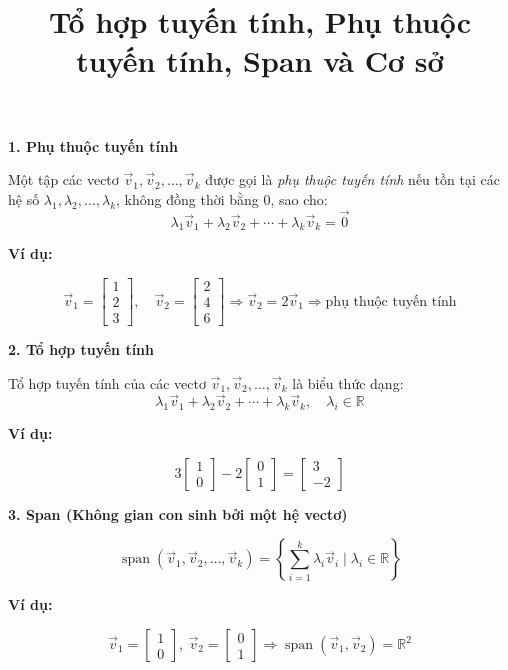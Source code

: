 \documentclass[12pt]{article}
\title{Tổ hợp tuyến tính, Phụ thuộc tuyến tính, Span và Cơ sở}
\date{}
\begin{document}
\maketitle

\textbf{1. Phụ thuộc tuyến tính}

Một tập các vectơ \( \vec{v}_1, \vec{v}_2, \ldots, \vec{v}_k \) được gọi là \textit{phụ thuộc tuyến tính} nếu tồn tại các hệ số \( \lambda_1, \lambda_2, \ldots, \lambda_k \), không đồng thời bằng 0, sao cho:
\[
\lambda_1 \vec{v}_1 + \lambda_2 \vec{v}_2 + \cdots + \lambda_k \vec{v}_k = \vec{0}
\]

\textbf{Ví dụ:}

\[
\vec{v}_1 = \begin{bmatrix} 1 \\ 2 \\ 3 \end{bmatrix}, \quad \vec{v}_2 = \begin{bmatrix} 2 \\ 4 \\ 6 \end{bmatrix} \Rightarrow \vec{v}_2 = 2\vec{v}_1
\Rightarrow \text{phụ thuộc tuyến tính}
\]

\textbf{2. Tổ hợp tuyến tính}

Tổ hợp tuyến tính của các vectơ \( \vec{v}_1, \vec{v}_2, \ldots, \vec{v}_k \) là biểu thức dạng:
\[
\lambda_1 \vec{v}_1 + \lambda_2 \vec{v}_2 + \cdots + \lambda_k \vec{v}_k, \quad \lambda_i \in \mathbb{R}
\]

\textbf{Ví dụ:}

\[
3 \begin{bmatrix} 1 \\ 0 \end{bmatrix} - 2 \begin{bmatrix} 0 \\ 1 \end{bmatrix} = \begin{bmatrix} 3 \\ -2 \end{bmatrix}
\]

\textbf{3. Span (Không gian con sinh bởi một hệ vectơ)}

\[
\operatorname{span}(\vec{v}_1, \vec{v}_2, \ldots, \vec{v}_k) = \left\{ \sum_{i=1}^k \lambda_i \vec{v}_i \mid \lambda_i \in \mathbb{R} \right\}
\]

\textbf{Ví dụ:}

\[
\vec{v}_1 = \begin{bmatrix} 1 \\ 0 \end{bmatrix},\ 
\vec{v}_2 = \begin{bmatrix} 0 \\ 1 \end{bmatrix} \Rightarrow \operatorname{span}(\vec{v}_1, \vec{v}_2) = \mathbb{R}^2
\]
\end{document}
